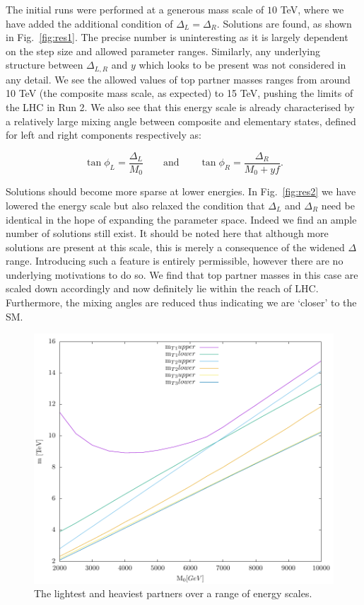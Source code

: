 \documentclass[a4paper]{jpconf}
\begin{document}
\noindent The initial runs were performed at a generous mass scale of \(10\) TeV, where we have added the additional condition of \(\Delta_L = \Delta_R\). Solutions are found, as shown in Fig.~\ref{fig:res1}. The precise number is uninteresting as it is largely dependent on the step size and allowed parameter ranges. Similarly, any underlying structure between \(\Delta_{L,R}\) and \(y\) which looks to be present was not considered in any detail. We see the allowed values of top partner masses ranges from around 10 TeV (the composite mass scale, as expected) to 15 TeV, pushing the limits of the LHC in Run 2. We also see that this energy scale is already characterised by a relatively large mixing angle between composite and elementary states, defined for left and right components respectively as:

\begin{equation}
\label{eq4}
\tan{\phi_L} = \frac{\Delta_L}{M_0} \qquad\text{and}\qquad \tan{\phi_R} = \frac{\Delta_R}{M_0 + yf}.
\end{equation}

\noindent Solutions should become more sparse at lower energies. In Fig.~\ref{fig:res2} we have lowered the energy scale but also relaxed the condition that \(\Delta_L\) and \(\Delta_R\) need be identical in the hope of expanding the parameter space. Indeed we find an ample number of solutions still exist. It should be noted here that although more solutions are present at this scale, this is merely a consequence of the widened \(\Delta\) range. Introducing such a feature is entirely permissible, however there are no underlying motivations to do so. We find that top partner masses in this case are scaled down accordingly and now definitely lie within the reach of LHC. Furthermore, the mixing angles are reduced thus indicating we are `closer' to the SM. \\

\begin{figure}[h]
	\centering
	\includegraphics[scale=0.5]{eigen_all}
	\caption{The lightest and heaviest partners over a range of energy scales.}
	\label{fig:res3}
\end{figure}
\end{document}
